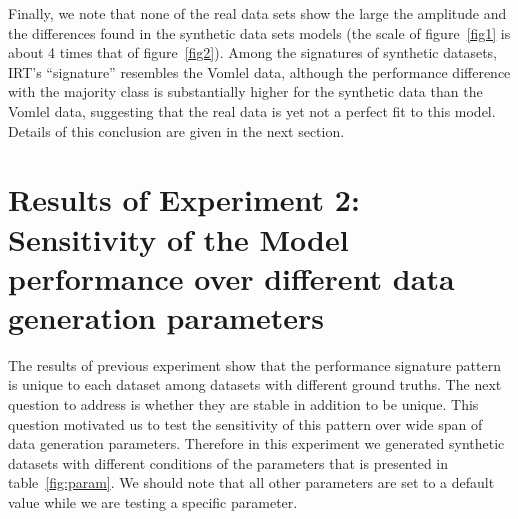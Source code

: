 
Finally, we note that none of the real data sets show the large the amplitude and the differences found in the synthetic data sets models (the scale of figure~\ref{fig1} is about 4 times that of figure~\ref{fig2}). Among the signatures of synthetic datasets, IRT's ``signature'' resembles the Vomlel data, although the performance difference with the majority class is substantially higher for the synthetic data than the Vomlel data, suggesting that the real data is yet not a perfect fit to this model. Details of this conclusion are given in the next section.

\section{Results of Experiment 2: Sensitivity of the Model performance over different data generation parameters}
\label{Sensitive}

The results of previous experiment show that the performance signature pattern is unique to each dataset among datasets with different ground truths. The next question to address is whether they are stable in addition to be unique. This question motivated us to test the sensitivity of this pattern over wide span of data generation parameters. Therefore in this experiment we generated synthetic datasets with different conditions of the parameters that is presented in table~\ref{fig:param}. We should note that all other parameters are set to a default value while we are testing a specific parameter.

